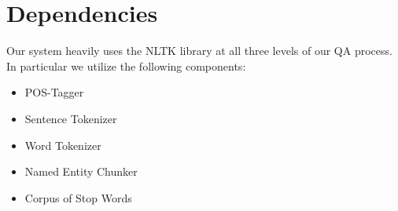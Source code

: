 \documentclass{article}
\begin{document}
\section{Dependencies}
Our system heavily uses the NLTK library at all three levels of our QA process. In particular we utilize the following components:
	\begin{itemize}
	\item POS-Tagger
	\item Sentence Tokenizer
	\item Word Tokenizer
	\item Named Entity Chunker
	\item Corpus of Stop Words
	\end{itemize}
\end{document}
